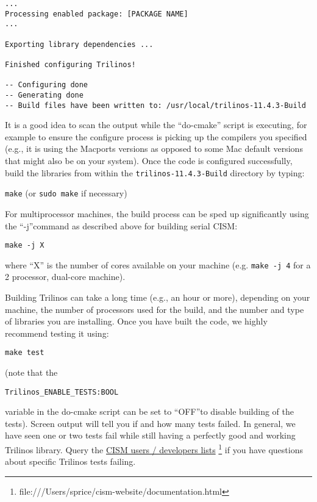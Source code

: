 \begin{verbatim}
...
Processing enabled package: [PACKAGE NAME]
...

Exporting library dependencies ...

Finished configuring Trilinos!

-- Configuring done
-- Generating done
-- Build files have been written to: /usr/local/trilinos-11.4.3-Build
\end{verbatim}

It is a good idea to scan the output while the ``do-cmake'' script is executing, 
for example to ensure the configure process is picking up the compilers you specified 
(e.g., it is using the Macports versions as opposed to some Mac default versions that 
might also be on your system). Once the code is configured successfully, build the libraries 
from within the \texttt{trilinos-11.4.3-Build} directory by typing:

\texttt{make} (or \texttt{sudo make} if necessary) 

For multiprocessor machines, the build process can be sped up significantly using 
the ``-j''command as described above for building serial CISM:

\texttt{make -j X}

where ``X'' is the number of cores available on your machine (e.g. \texttt{make -j 4} 
for a 2 processor, dual-core machine).

Building Trilinos can take a long time (e.g., an hour or more), depending on your machine, 
the number of processors used for the build, and the number and type of libraries 
you are installing. Once you have built the code, we highly recommend testing it 
using:

 \texttt{make test} 

(note that the

\begin{verbatim}
Trilinos_ENABLE_TESTS:BOOL
\end{verbatim}

variable in the do-cmake script can be set to ``OFF''to disable building of the tests). 
Screen output will tell you if and how many tests failed. In general, we have seen 
one or two tests fail while still having a perfectly good and working Trilinos library. 
Query the \href{file:///Users/sprice/cism-website/documentation.html}{CISM users / developers lists}
\footnote{file:///Users/sprice/cism-website/documentation.html} if you have questions 
about specific Trilinos tests failing. 

